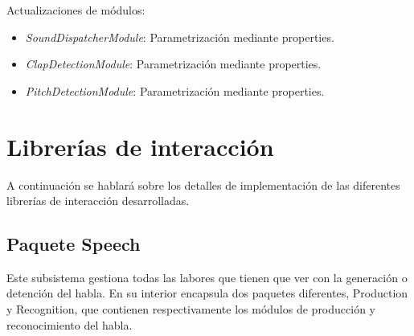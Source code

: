 Actualizaciones de módulos:

\begin{itemize}
	\item \textit{SoundDispatcherModule}: Parametrización mediante properties.
	\item \textit{ClapDetectionModule}: Parametrización mediante properties.
	\item \textit{PitchDetectionModule}: Parametrización mediante properties.

\end{itemize}

\newpage

\section{Librerías de interacción}
A continuación se hablará sobre los detalles de implementación de las diferentes librerías de interacción desarrolladas.
\label{sec:InteractionLibraries}

\subsection{Paquete Speech}
Este subsistema gestiona todas las labores que tienen que ver con la generación o detención del habla. En su interior encapsula dos paquetes diferentes, Production y Recognition, que contienen respectivamente los módulos de producción y reconocimiento del habla.

